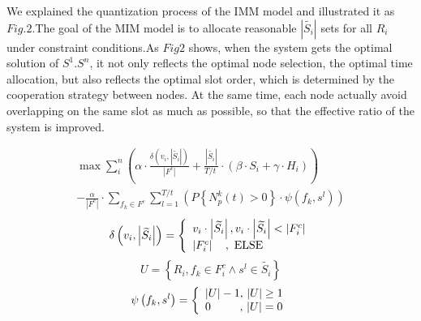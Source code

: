 \documentclass[conference,compsoc]{IEEEtran}
\begin{document}
We explained the quantization process of the IMM model and illustrated it as $Fig.2$.The goal of the MIM model is to allocate reasonable $|\widetilde{{{S}_{i}}}|$ sets for all $R_i$under constraint conditions.As $Fig2$ shows, when the system gets the optimal solution of $S ^ 1. S ^ n $, it not only reflects the optimal node selection, the optimal time allocation, but also reflects the optimal slot order, which is determined by the cooperation strategy between nodes. At the same time, each node actually avoid overlapping on the same slot as much as possible, so that the effective ratio of the system is improved.




\begin{equation}
\begin{split}
\max \sum\limits_{i}^{n}{(\alpha \cdot \frac{\delta ({{v}_{i}},\left| \widetilde{{{S}_{i}}} \right|)}{\left| {{F}^{c}} \right|}+\frac{\left| \widetilde{{{S}_{i}}} \right|}{{T}/{t}\;}\cdot (\beta \cdot {{S}_{i}}+\gamma \cdot {{H}_{i}}))}  \\
-\frac{\alpha }{\left| {{F}^{c}} \right|}\cdot \sum\limits_{{{f}_{k}}\in {{F}^{c}}}{\sum\limits_{l=1}^{{T}/{t}\;}{\left( P\left\{ N_{p}^{k}\left( t \right)>0 \right\}\cdot \psi \left( {{f}_{k}},{{s}^{l}} \right) \right)}}
\end{split}
\end{equation}
\begin{equation}
\delta \left( {{v_i},\left| {\widetilde {{S_i}}} \right|} \right) = \left\{ \begin{array}{l}
{v_i} \cdot \left| {\widetilde {{S_i}}} \right|,{\rm{    }}{v_i} \cdot \left| {\widetilde {{S_i}}} \right| < \left| {F_i^c} \right|\\
\left| {F_i^c} \right|{\rm{   }}\quad,\ {\rm{    ELSE}}
\end{array} \right.
\end{equation}
\begin{equation}
U = \left\{ {{R_i},{f_k} \in F_i^c \wedge {s^l} \in \widetilde {{S_i}}} \right\}
\end{equation}
\begin{equation}
\psi \left( {{f_k},{s^l}} \right) = \left\{ \begin{array}{l}
\left| U \right| - 1,{\rm{    }}\left| U \right| \ge 1\\
{\rm{   }}0\quad \quad \; \; ,\, \left| U \right| = 0
\end{array} \right.
\end{equation}
\end{document}
